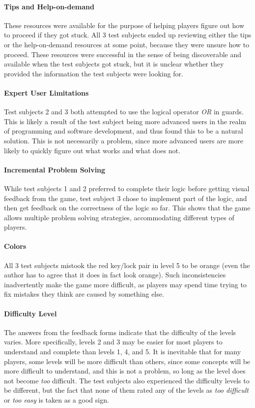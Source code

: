 \paragraph{Tips and Help-on-demand} These resources were available for the purpose of helping players figure out how to proceed if they got stuck. All 3 test subjects ended up reviewing either the tips or the help-on-demand resources at some point, because they were unsure how to proceed. These resources were successful in the sense of being discoverable and available when the test subjects got stuck, but it is unclear whether they provided the information the test subjects were looking for.

\paragraph{Expert User Limitations} Test subjects 2 and 3 both attempted to use the logical operator \emph{OR} in guards. This is likely a result of the test subject being more advanced users in the realm of programming and software development, and thus found this to be a natural solution. This is not necessarily a problem, since more advanced users are more likely to quickly figure out what works and what does not.

\paragraph{Incremental Problem Solving} While test subjects 1 and 2 preferred to complete their logic before getting visual feedback from the game, test subject 3 chose to implement part of the logic, and then get feedback on the correctness of the logic so far. This shows that the game allows multiple problem solving strategies, accommodating different types of players.

\paragraph{Colors} All 3 test subjects mistook the red key/lock pair in level 5 to be orange (even the author has to agree that it does in fact look orange). Such inconsistencies inadvertently make the game more difficult, as players may spend time trying to fix mistakes they think are caused by something else.

\paragraph{Difficulty Level} The answers from the feedback forms indicate that the difficulty of the levels varies. More specifically, levels 2 and 3 may be easier for most players to understand and complete than levels 1, 4, and 5. It is inevitable that for many players, some levels will be more difficult than others, since some concepts will be more difficult to understand, and this is not a problem, so long as the level does not become \emph{too} difficult. The test subjects also experienced the difficulty levels to be different, but the fact that none of them rated any of the levels as \emph{too difficult} or \emph{too easy} is taken as a good sign.

